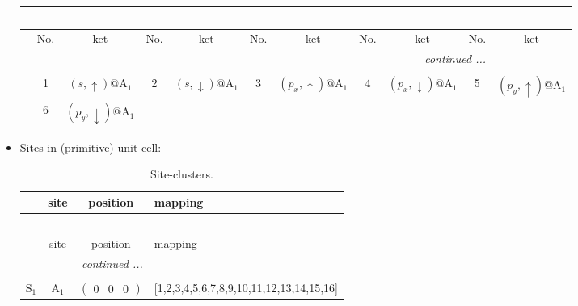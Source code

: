 \documentclass[fleqn,10pt,landscape]{article}
\begin{document}
\begin{itemize}
\begin{center}
\begin{longtable}{c|cc|cc|cc|cc|cc}
\multicolumn{10}{l}{\tablename\ \thetable{}} \\
 \hline \hline
 & No. & ket & No. & ket & No. & ket & No. & ket & No. & ket \\ \hline \endhead

 \hline \hline
\multicolumn{10}{r}{\footnotesize\it continued ...} \\ \endfoot

 \hline \hline
\multicolumn{10}{r}{} \\ \endlastfoot

 & 1 & $(s,\uparrow)$@A$_{1}$ & 2 & $(s,\downarrow)$@A$_{1}$ & 3 & $(p_{x},\uparrow)$@A$_{1}$ & 4 & $(p_{x},\downarrow)$@A$_{1}$ & 5 & $(p_{y},\uparrow)$@A$_{1}$ \\
& 6 & $(p_{y},\downarrow)$@A$_{1}$ &  &  &  &  &  &  &  &  \\
\end{longtable}
\end{center}

\item Sites in (primitive) unit cell:
\begin{center}
\renewcommand{\arraystretch}{1.3}
\begin{longtable}{cc|c|l}
\caption{Site-clusters.}
 \\
 \hline \hline
 & site & position & mapping \\ \hline \endfirsthead

\multicolumn{3}{l}{\tablename\ \thetable{}} \\
 \hline \hline
 & site & position & mapping \\ \hline \endhead

 \hline \hline
\multicolumn{3}{r}{\footnotesize\it continued ...} \\ \endfoot

 \hline \hline
\multicolumn{3}{r}{} \\ \endlastfoot

S$_{1}$ & A$_1$ & $\begin{pmatrix} 0 & 0 & 0 \end{pmatrix}$ & [1,2,3,4,5,6,7,8,9,10,11,12,13,14,15,16] \\
\end{longtable}
\end{center}


\end{itemize}
\end{document}

